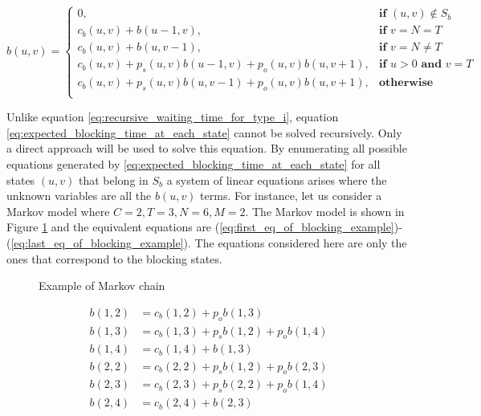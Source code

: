 \small
\begin{equation}\label{eq:expected_blocking_time_at_each_state}
    b(u,v) =
    \begin{cases}
        0, & \textbf{if } (u,v) \notin S_b \\
        c_b(u,v) + b(u - 1, v), & \textbf{if } v = N = T\\
        c_b(u,v) + b(u, v-1), & \textbf{if } v = N \neq T \\
        c_b(u,v) + p_s(u,v) b(u-1, v) + p_o(u,v) b(u, v+1), & \textbf{if } u > 0
        \textbf{ and } v = T \\
        c_b(u,v) + p_s(u,v) b(u, v-1) + p_o(u,v) b(u, v+1), & \textbf{otherwise} \\
    \end{cases}
\end{equation}
\normalsize

Unlike equation \ref{eq:recursive_waiting_time_for_type_i}, equation
\ref{eq:expected_blocking_time_at_each_state} cannot be solved recursively.
Only a direct approach will be used to solve this equation.
By enumerating all possible equations generated by
\ref{eq:expected_blocking_time_at_each_state} for all states \((u,v)\) that
belong in \(S_b\) a system of linear equations arises where the unknown
variables are all the \(b(u,v)\) terms.
For instance, let us consider a Markov model where \(C=2, T=3, N=6, M=2\).
The Markov model is shown in Figure \ref{fig:example-algeb-blocking}
and the equivalent equations are
(\ref{eq:first_eq_of_blocking_example})-(\ref{eq:last_eq_of_blocking_example}).
The equations considered here are only the ones that correspond to the blocking
states.


\begin{minipage}{0.45\textwidth}
    \begin{figure}[H]
        \scalebox{0.5}{}
        \caption{Example of Markov chain}
        \label{fig:example-algeb-blocking}
    \end{figure}
\end{minipage}
\begin{minipage}{0.5\textwidth}
    \footnotesize
    \begin{align}
        b(1,2) &= c_b(1,2) + p_o b(1,3) \label{eq:first_eq_of_blocking_example} \\
        b(1,3) &= c_b(1,3) + p_s b(1,2) + p_o b(1,4) \\
        b(1,4) &= c_b(1,4) + b(1,3) \\
        b(2,2) &= c_b(2,2) + p_s b(1,2) + p_o b(2,3) \\
        b(2,3) &= c_b(2,3) + p_s b(2,2) + p_o b(1,4) \\
        b(2,4) &= c_b(2,4) + b(2,3)\label{eq:last_eq_of_blocking_example}
    \end{align}
    \normalsize
\end{minipage}



